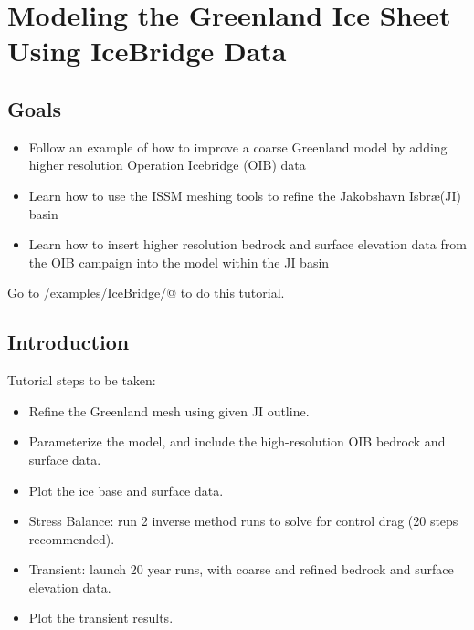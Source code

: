 \section{Modeling the Greenland Ice Sheet Using IceBridge Data}
\subsection{Goals} %
\begin{itemize}
	\item Follow an example of how to improve a coarse Greenland model by adding higher resolution Operation Icebridge (OIB) data
	\item Learn how to use the ISSM meshing tools to refine the Jakobshavn Isbr\ae (JI) basin
	\item Learn how to insert higher resolution bedrock and surface elevation data from the OIB campaign into the model within the JI basin
\end{itemize}

Go to \verb@trunk/examples/IceBridge/@ to do this tutorial.

\subsection{Introduction}%
Tutorial steps to be taken:
\begin{itemize}
	\item Refine the Greenland mesh using given JI outline.
	\item Parameterize the model, and include the high-resolution OIB bedrock and surface data.
	\item Plot the ice base and surface data.
	\item Stress Balance: run 2 inverse method runs to solve for control drag (20 steps recommended).
	\item Transient: launch 20 year runs, with coarse and refined bedrock and surface elevation data.
	\item Plot the transient results.
\end{itemize}
